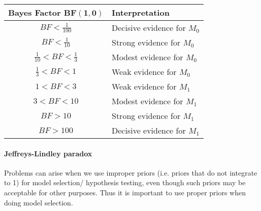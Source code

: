  

\begin{table}[h!]
	\begin{tabular}{|cl|}
		\hline
	\textbf{Bayes Factor} $\bm{BF(1,0)}$ & \textbf{Interpretation}\\
		\hline
		$BF<\frac{1}{100}$ & Decisive evidence for $M_{0}$\\
		\hline
		$BF<\frac{1}{10}$ & Strong evidence for $M_{0}$\\
		\hline
		$\frac{1}{10}<BF<\frac{1}{3}$ & Modest evidence for $M_{0}$\\
		\hline
		$\frac{1}{3}<BF<1$ & Weak evidence for $M_{0}$\\
		\hline
		$1<BF<3$ & Weak evidence for $M_{1}$\\
		\hline
		$3<BF<10$ & Modest evidence for $M_{1}$\\
		\hline
		$BF>10 $ &  Strong evidence for $M_{1}$\\
		\hline
		$BF>100$ & Decisive evidence for $M_{1}$\\
		\hline
	\end{tabular}
\end{table}


\paragraph{Jeffreys-Lindley paradox}
Problems can arise when we use improper priors (i.e. priors that do not integrate to 1)
for model selection/ hypothesis testing, even though such priors may be acceptable for 
other purposes.  Thus it is important to use proper priors when doing model selection.
